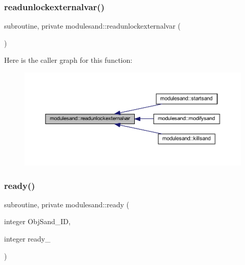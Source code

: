 \subsubsection{\texorpdfstring{readunlockexternalvar()}{readunlockexternalvar()}}
{\footnotesize\ttfamily subroutine, private modulesand\+::readunlockexternalvar (\begin{DoxyParamCaption}{ }\end{DoxyParamCaption})\hspace{0.3cm}{\ttfamily [private]}}

Here is the caller graph for this function\+:\nopagebreak
\begin{figure}[H]
\begin{center}
\leavevmode
\includegraphics[width=350pt]{namespacemodulesand_af758b46396eb7217217ae5f30679be76_icgraph}
\end{center}
\end{figure}
\mbox{\label{namespacemodulesand_a663024ee5ee19e5c00cce90c271934ea}} 
\subsubsection{\texorpdfstring{ready()}{ready()}}
{\footnotesize\ttfamily subroutine, private modulesand\+::ready (\begin{DoxyParamCaption}\item[{integer}]{Obj\+Sand\+\_\+\+ID,  }\item[{integer}]{ready\+\_\+ }\end{DoxyParamCaption})\hspace{0.3cm}{\ttfamily [private]}}

